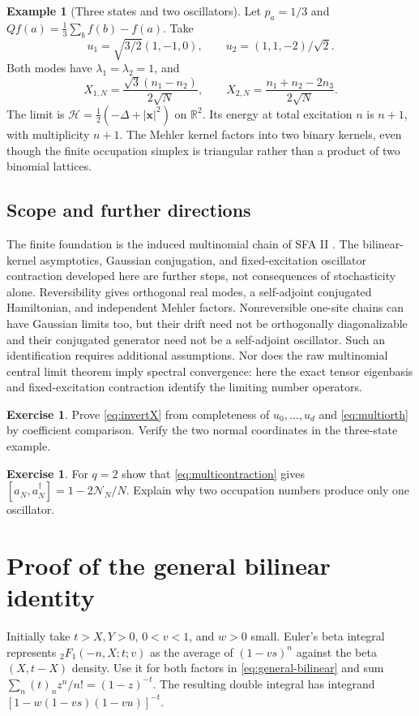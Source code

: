 \documentclass[11pt,reqno]{amsart}
\theoremstyle{definition}
\newtheorem{example}[theorem]{Example}
\newtheorem{exercise}[theorem]{Exercise}
\theoremstyle{remark}
\newcommand{\R}{\mathbb R}
\newcommand{\NN}{\mathcal N}
\begin{document}
\begin{example}[Three states and two oscillators]
Let $p_a=1/3$ and $Qf(a)=\frac13\sum_bf(b)-f(a)$. Take
\[
u_1=\sqrt{3/2}(1,-1,0),\qquad u_2=(1,1,-2)/\sqrt2.
\]
Both modes have $\lambda_1=\lambda_2=1$, and
\[
X_{1,N}=\frac{\sqrt3(n_1-n_2)}{2\sqrt N},\qquad
X_{2,N}=\frac{n_1+n_2-2n_3}{2\sqrt N}.
\]
The limit is $\mathcal H=\frac12(-\Delta+|\mathbf x|^2)$ on $\R^2$.
Its energy at total excitation $n$ is $n+1$, with multiplicity $n+1$.
The Mehler kernel factors into two binary kernels, even though the
finite occupation simplex is triangular rather than a product of two
binomial lattices.
\end{example}

\subsection{Scope and further directions}
The finite foundation is the induced multinomial chain of SFA II
\cite{FeinsilverSFAII2023}. The bilinear-kernel asymptotics, Gaussian conjugation,
and fixed-excitation oscillator contraction developed here are further
steps, not consequences of stochasticity alone.
Reversibility gives orthogonal real modes, a self-adjoint conjugated
Hamiltonian, and independent Mehler factors. Nonreversible one-site
chains can have Gaussian limits too, but their drift need not be
orthogonally diagonalizable and their conjugated generator need not be
a self-adjoint oscillator. Such an identification requires additional
assumptions. Nor does the raw multinomial central limit theorem imply
spectral convergence: here the exact tensor eigenbasis and
fixed-excitation contraction identify the limiting number operators.

\begin{exercise}
Prove \eqref{eq:invertX} from completeness of $u_0,\ldots,u_d$ and
\eqref{eq:multiorth} by coefficient comparison. Verify the two normal
coordinates in the three-state example.
\end{exercise}
\begin{exercise}
For $q=2$ show that \eqref{eq:multicontraction} gives
$[a_N,a_N^\dagger]=1-2\NN_N/N$. Explain why two occupation numbers
produce only one oscillator.
\end{exercise}
\appendix
\section{Proof of the general bilinear identity}\label{app:bilinear}
Initially take $t>X,Y>0$, $0<v<1$, and $w>0$ small. Euler's beta
integral represents ${}_2F_1(-n,X;t;v)$ as the average of $(1-vs)^n$
against the beta$(X,t-X)$ density. Use it for both factors in
\eqref{eq:general-bilinear} and sum
$\sum_n(t)_nz^n/n!=(1-z)^{-t}$. The resulting double integral has
integrand $[1-w(1-vs)(1-vu)]^{-t}$.
\end{document}

